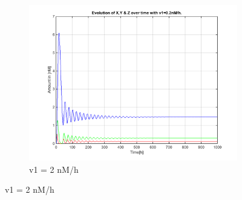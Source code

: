 \documentclass[10pt,a4paper,oneside,twocolumn]{article}
\numberwithin{equation}{section} %
\begin{document}
\begin{figure}
\begin{subfigure}[b]{0.32\textwidth}
	    \includegraphics[width=\textwidth]{LotsofthesameA/A-A2.png}
	    \caption{v1 = 2 nM/h}
	\end{subfigure}
	 

\end{figure}
\end{document}
